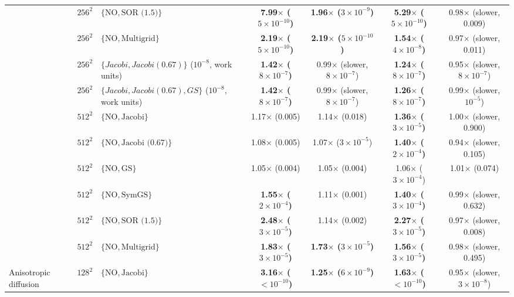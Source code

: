 {\begin{tabular}{lllcccc}
 & $256^2$ & $\{\mathrm{NO}, \text{SOR (1.5)}\}$ & \textbf{7.99$\times$ ($5\times10^{-10}$)} & \textbf{1.96$\times$ ($3\times10^{-9}$)} & \textbf{5.29$\times$ ($5\times10^{-10}$)} & 0.98$\times$ (slower, 0.009) \\
 & $256^2$ & $\{\mathrm{NO}, \text{Multigrid}\}$ & \textbf{2.19$\times$ ($5\times10^{-10}$)} & \textbf{2.19$\times$ ($5\times10^{-10}$)} & \textbf{1.54$\times$ ($4\times10^{-8}$)} & 0.97$\times$ (slower, 0.011) \\
 & $256^2$ & $\{Jacobi, Jacobi (0.67)\}$ ($10^{-8}$, work units) & \textbf{1.42$\times$ ($8\times10^{-7}$)} & 0.99$\times$ (slower, $8\times10^{-7}$) & \textbf{1.24$\times$ ($8\times10^{-7}$)} & 0.95$\times$ (slower, $8\times10^{-7}$) \\
 & $256^2$ & $\{Jacobi, Jacobi (0.67), GS\}$ ($10^{-8}$, work units) & \textbf{1.42$\times$ ($8\times10^{-7}$)} & 0.99$\times$ (slower, $8\times10^{-7}$) & \textbf{1.26$\times$ ($8\times10^{-7}$)} & 0.99$\times$ (slower, $10^{-5}$) \\
 & $512^2$ & $\{\mathrm{NO}, \text{Jacobi}\}$ & 1.17$\times$ (0.005) & 1.14$\times$ (0.018) & \textbf{1.36$\times$ ($3\times10^{-5}$)} & 1.00$\times$ (slower, 0.900) \\
 & $512^2$ & $\{\mathrm{NO}, \text{Jacobi (0.67)}\}$ & 1.08$\times$ (0.005) & 1.07$\times$ ($3\times10^{-5}$) & \textbf{1.40$\times$ ($2\times10^{-4}$)} & 0.94$\times$ (slower, 0.105) \\
 & $512^2$ & $\{\mathrm{NO}, \text{GS}\}$ & 1.05$\times$ (0.004) & 1.05$\times$ (0.004) & 1.06$\times$ ($3\times10^{-4}$) & 1.01$\times$ (0.074) \\
 & $512^2$ & $\{\mathrm{NO}, \text{SymGS}\}$ & \textbf{1.55$\times$ ($2\times10^{-4}$)} & 1.11$\times$ (0.001) & \textbf{1.40$\times$ ($3\times10^{-4}$)} & 0.99$\times$ (slower, 0.632) \\
 & $512^2$ & $\{\mathrm{NO}, \text{SOR (1.5)}\}$ & \textbf{2.48$\times$ ($3\times10^{-5}$)} & 1.14$\times$ (0.002) & \textbf{2.27$\times$ ($3\times10^{-5}$)} & 0.97$\times$ (slower, 0.008) \\
 & $512^2$ & $\{\mathrm{NO}, \text{Multigrid}\}$ & \textbf{1.83$\times$ ($3\times10^{-5}$)} & \textbf{1.73$\times$ ($3\times10^{-5}$)} & \textbf{1.56$\times$ ($3\times10^{-5}$)} & 0.98$\times$ (slower, 0.495) \\
\midrule
Anisotropic diffusion & $128^2$ & $\{\mathrm{NO}, \text{Jacobi}\}$ & \textbf{3.16$\times$ ($<10^{-10}$)} & \textbf{1.25$\times$ ($6\times10^{-9}$)} & \textbf{1.63$\times$ ($<10^{-10}$)} & 0.95$\times$ (slower, $3\times10^{-8}$) \\

\end{tabular}}

